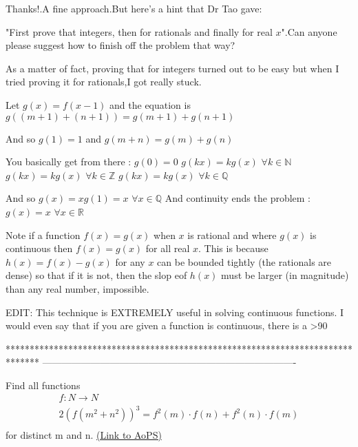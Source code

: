 \begin{solution}
	\begin{tcolorbox}Thanks!.A fine approach.But here's a hint that Dr Tao gave:

"First prove that integers, then for rationals and finally for real $x$".Can anyone please suggest how to finish off the problem that way?

As a matter of fact, proving that for integers turned out to be easy but when I tried proving it for rationals,I got really stuck.\end{tcolorbox}
Let $g(x)=f(x-1)$ and the equation is $g((m+1)+(n+1))=g(m+1)+g(n+1)$

And so $g(1)=1$ and $g(m+n)=g(m)+g(n)$

You basically get from there :
$g(0)=0$
$g(kx)=kg(x)$ $\forall k\in\mathbb N$
$g(kx)=kg(x)$ $\forall k\in\mathbb Z$
$g(kx)=kg(x)$ $\forall k\in\mathbb Q$

And so $g(x)=xg(1)=x$ $\forall x\in\mathbb Q$
And continuity ends the problem : $g(x)=x$ $\forall x\in\mathbb R$
\end{solution}



\begin{solution}
	Note if a function $f(x)=g(x)$ when $x$ is rational and where $g(x)$ is continuous then $f(x)=g(x)$ for all real $x$.  This is because $h(x)=f(x)-g(x)$ for any $x$ can be bounded tightly (the rationals are dense) so that if it is not, then the slop eof $h(x)$ must be larger (in magnitude) than any real number, impossible.

EDIT: This technique is EXTREMELY useful in solving continuous functions.  I would even say that if you are given a function is continuous, there is a >90%
\end{solution}
*******************************************************************************
-------------------------------------------------------------------------------

\begin{problem}
	Find all functions 
\[
\begin{array}{l}
 f:N \to N \\ 
 2(f(m^2  + n^2 ))^3  = f^2 (m) \cdot f(n) + f^2 (n) \cdot f(m) \\ 
 \end{array}
\] for distinct m and n.
	\flushright \href{https://artofproblemsolving.com/community/c6h464961}{(Link to AoPS)}
\end{problem}



